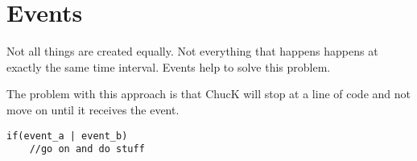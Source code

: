 \section{Events}

Not all things are created equally. Not everything that happens happens at exactly the same time interval. Events help to solve this problem.

The problem with this approach is that ChucK will stop at a line of code and not move on until it receives the event. 

\begin{verbatim}
if(event_a | event_b)
	//go on and do stuff
\end{verbatim}	